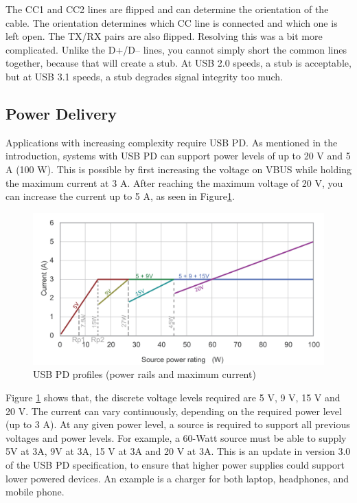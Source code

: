 The CC1 and CC2 lines are flipped and can determine the orientation of the cable. The orientation determines which CC line is connected and which one is left open. The TX/RX pairs are also flipped. Resolving this was a bit more complicated. Unlike the D+/D– lines, you cannot simply short the common lines together, because that will create a stub. At USB 2.0 speeds, a stub is acceptable, but at USB 3.1 speeds, a stub degrades signal integrity too much.

 \subsection{Power Delivery}
 Applications with increasing complexity require USB PD. As mentioned in the introduction, systems with USB PD can support power levels of up to 20 V and 5 A (100 W). This is possible by first increasing the voltage on VBUS while holding the maximum current at 3 A. After reaching the maximum voltage of 20 V, you can increase the current up to 5 A, as seen in Figure\ref{fig:typec_power}.
 
\begin{figure}[htb]
\centering
	\includegraphics[scale=0.45]{Chapter2/PD_rating.png}	
	\caption{ USB PD profiles (power rails and maximum current) \cite{usb_power_delivery} }
	\label{fig:typec_power}
\end{figure}

Figure \ref{fig:typec_power} shows that, the discrete voltage levels required are 5 V, 9 V, 15 V and 20 V. The current can vary continuously, depending on the required power level (up to 3 A).  At any given power level, a source is required to support all previous voltages and power levels. For example, a 60-Watt source must be able to supply 5V at 3A, 9V at 3A, 15 V at 3A and 20 V at 3A. This is an update in version 3.0 of the USB PD specification, to ensure that higher power supplies could support lower powered devices. An example is a charger for both laptop, headphones, and mobile phone\cite{enos2022primer}.

